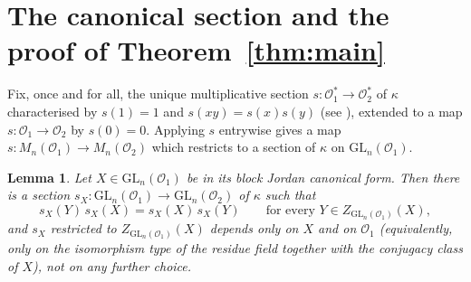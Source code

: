 \documentclass[11pt]{amsart}
\newtheorem{lemma}[theorem]{Lemma}
\theoremstyle{definition}
\newcommand{\GL}{\mathrm{GL}}
\begin{document}
	\section{The canonical section and the proof of Theorem~\ref{thm:main}}
	\label{sec:section}
	
	Fix, once and for all, the unique multiplicative section
	$s:\mathcal O_1^*\to \mathcal O_2^*$ of $\kappa$ characterised by
	$s(1)=1$ and $s(xy)=s(x)s(y)$ (see \cite[Prop.~8]{Serre}), extended to a
	map $s:\mathcal O_1\to\mathcal O_2$ by $s(0)=0$. Applying $s$ entrywise
	gives a map $s:M_n(\mathcal O_1)\to M_n(\mathcal O_2)$ which restricts to a
	section of $\kappa$ on $\GL_n(\mathcal O_1)$.
	
	\begin{lemma}\label{lem:section}
		Let $X\in \GL_n(\mathcal O_1)$ be in its block Jordan canonical form. Then
		there is a section $s_X:\GL_n(\mathcal O_1)\to\GL_n(\mathcal O_2)$ of
		$\kappa$ such that
		\[
		s_X(Y)\,s_X(X)=s_X(X)\,s_X(Y)\qquad\text{for every } Y\in
		Z_{\GL_n(\mathcal O_1)}(X),
		\]
		and $s_X$ restricted to $Z_{\GL_n(\mathcal O_1)}(X)$ depends only on $X$
		and on $\mathcal O_1$ (equivalently, only on the isomorphism type of the
		residue field together with the conjugacy class of $X$), not on any further
		choice.
	\end{lemma}
	
\end{document}
